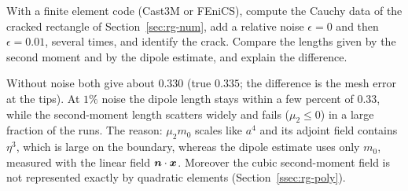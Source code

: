 \label{exo:rg-codes}
With a finite element code (Cast3M or FEniCS), compute the Cauchy data of the cracked rectangle of Section~\ref{sec:rg-num}, add a relative noise $\epsilon=0$ and then $\epsilon=0.01$, several times, and identify the crack. Compare the lengths given by the second moment and by the dipole estimate, and explain the difference.
\begin{solution}
Without noise both give about $0.330$ (true $0.335$; the difference is the mesh error at the tips). At $1\%$ noise the dipole length stays within a few percent of $0.33$, while the second-moment length scatters widely and fails ($\mu_2\le0$) in a large fraction of the runs. The reason: $\mu_2m_0$ scales like $a^4$ and its adjoint field contains $\eta^3$, which is large on the boundary, whereas the dipole estimate uses only $m_0$, measured with the linear field $\bm{n}\cdot\bm{x}$. Moreover the cubic second-moment field is not represented exactly by quadratic elements (Section~\ref{ssec:rg-poly}).
\end{solution}

